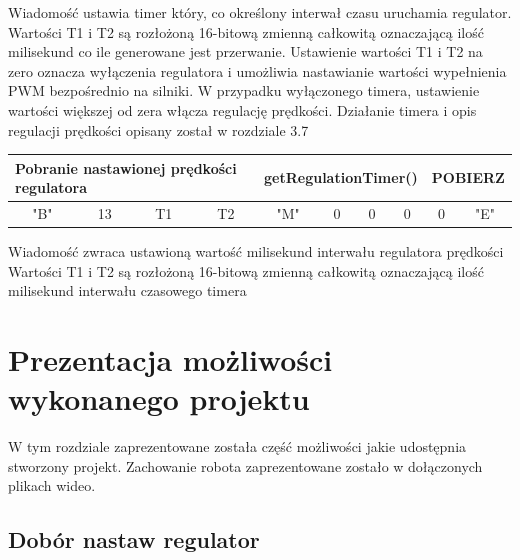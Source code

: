 \documentclass[eng,printmode]{mgr}
\begin{document}
Wiadomość ustawia timer który, co określony interwał czasu uruchamia regulator.
Wartości T1 i T2 są rozłożoną 16-bitową zmienną całkowitą oznaczającą ilość milisekund co ile generowane jest przerwanie.
Ustawienie wartości T1 i T2 na zero oznacza wyłączenia regulatora i umożliwia nastawianie wartości wypełnienia PWM bezpośrednio na silniki. W przypadku wyłączonego timera, ustawienie wartości większej od zera włącza regulację prędkości.
Działanie timera i opis regulacji prędkości opisany został w rozdziale 3.7

\begin{table}[!htb]
\centering
\begin{adjustbox}{width=1\textwidth}
\label{my-label}
\begin{tabular}{|c|c|c|c|c|c|c|c|c|c|}
\hline
\multicolumn{4}{|l|}{Pobranie nastawionej prędkości regulatora   } & \multicolumn{4}{l|}{getRegulationTimer()} & \multicolumn{2}{l|}{POBIERZ} \\ \hline
"B" \hspace{1em}             & 13\hspace{2em}              & T1\hspace{2em}              & T2\hspace{2em}         & "M"\hspace{2em}         & 0\hspace{2em}         & 0\hspace{2em}         & 0\hspace{2em}         & 0\hspace{2em}          & "E"\hspace{2em}          \\ \hline
\end{tabular}
\end{adjustbox}
\end{table}

Wiadomość zwraca ustawioną wartość milisekund interwału regulatora prędkości
Wartości T1 i T2 są rozłożoną 16-bitową zmienną całkowitą oznaczającą ilość milisekund interwału czasowego timera


  \chapter{Prezentacja możliwości wykonanego projektu}
W tym rozdziale zaprezentowane została część możliwości jakie udostępnia stworzony projekt. Zachowanie robota zaprezentowane zostało w dołączonych plikach wideo. 

 \section{Dobór nastaw regulator}
\end{document}
